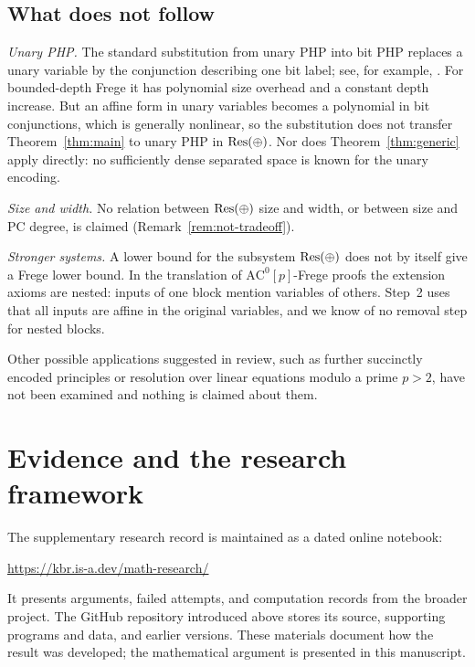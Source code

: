 \subsection{What does not follow}
\emph{Unary PHP.} The standard substitution from unary PHP into bit PHP
replaces a unary variable by the conjunction describing one bit label; see,
for example, \cite{BB21}. For bounded-depth Frege it has polynomial size
overhead and a constant depth increase. But an affine form in unary
variables becomes a polynomial in bit conjunctions, which is generally
nonlinear, so the substitution does not transfer Theorem~\ref{thm:main} to
unary PHP in \(\mathrm{Res}(\oplus)\). Nor does Theorem~\ref{thm:generic} apply directly:
no sufficiently dense separated space is known for the unary encoding.

\emph{Size and width.} No relation between \(\mathrm{Res}(\oplus)\) size and width, or
between size and PC degree, is claimed (Remark~\ref{rem:not-tradeoff}).

\emph{Stronger systems.} A lower bound for the subsystem \(\mathrm{Res}(\oplus)\) does not
by itself give a Frege lower bound. In the translation of
\(\mathrm{AC}^0[p]\)-Frege proofs \cite{BIKPRS} the extension axioms are
nested: inputs of one block mention variables of others. Step~2 uses that
all inputs are affine in the original variables, and we know of no
removal step for nested blocks.

Other possible applications suggested in review, such as further succinctly
encoded principles or resolution over linear equations modulo a prime
\(p>2\), have not been examined and nothing is claimed about them.

\section{Evidence and the research framework}\label{sec:framework}

The supplementary research record is maintained as a dated online notebook:
\begin{center}
 \url{https://kbr.is-a.dev/math-research/}
\end{center}
It presents arguments, failed attempts, and computation records from the
broader project. The GitHub repository introduced above stores its source,
supporting programs and data, and earlier versions. These materials document
how the result was developed; the mathematical argument is presented in
this manuscript.

